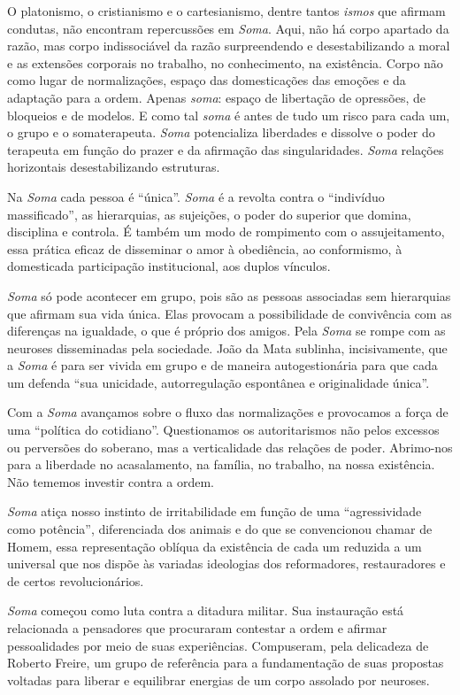 O platonismo, o cristianismo e o cartesianismo, dentre tantos
\emph{ismos} que afirmam condutas, não encontram repercussões em
\emph{Soma}. Aqui, não há corpo apartado da razão, mas corpo
indissociável da razão surpreendendo e desestabilizando a moral e as
extensões corporais no trabalho, no conhecimento, na existência. Corpo
não como lugar de normalizações, espaço das domesticações das emoções e
da adaptação para a ordem. Apenas \emph{soma}: espaço de libertação de
opressões, de bloqueios e de modelos. E como tal \emph{soma} é antes de
tudo um risco para cada um, o grupo e o somaterapeuta. \emph{Soma}
potencializa liberdades e dissolve o poder do terapeuta em função do
prazer e da afirmação das singularidades. \emph{Soma} relações
horizontais desestabilizando estruturas.

Na \emph{Soma} cada pessoa é ``única''. \emph{Soma} é a revolta contra o
``indivíduo massificado'', as hierarquias, as sujeições, o poder do
superior que domina, disciplina e controla. É também um modo de
rompimento com o assujeitamento, essa prática eficaz de disseminar o
amor à obediência, ao conformismo, à domesticada participação
institucional, aos duplos vínculos.

\emph{Soma} só pode acontecer em grupo, pois são as pessoas associadas
sem hierarquias que afirmam sua vida única. Elas provocam a
possibilidade de convivência com as diferenças na igualdade, o que é
próprio dos amigos. Pela \emph{Soma} se rompe com as neuroses
disseminadas pela sociedade. João da Mata sublinha, incisivamente, que a
\emph{Soma} é para ser vivida em grupo e de maneira autogestionária para
que cada um defenda ``sua unicidade, autorregulação espontânea e
originalidade única''.

Com a \emph{Soma} avançamos sobre o fluxo das normalizações e provocamos
a força de uma ``política do cotidiano''. Questionamos os autoritarismos
não pelos excessos ou perversões do soberano, mas a verticalidade das
relações de poder. Abrimo-nos para a liberdade no acasalamento, na
família, no trabalho, na nossa existência. Não tememos investir contra a
ordem.

\emph{Soma} atiça nosso instinto de irritabilidade em função de uma
``agressividade como potência'', diferenciada dos animais e do que se
convencionou chamar de Homem, essa representação oblíqua da existência
de cada um reduzida a um universal que nos dispõe às variadas ideologias
dos reformadores, restauradores e de certos revolucionários.

\emph{Soma} começou como luta contra a ditadura militar. Sua instauração
está relacionada a pensadores que procuraram contestar a ordem e afirmar
pessoalidades por meio de suas experiências. Compuseram, pela delicadeza
de Roberto Freire, um grupo de referência para a fundamentação de suas
propostas voltadas para liberar e equilibrar energias de um corpo
assolado por neuroses.

